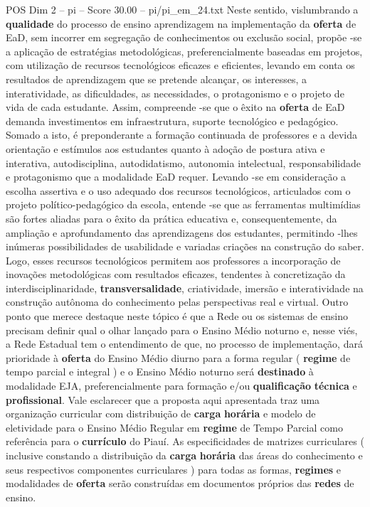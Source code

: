 \begin{textsample}{POS Dim 2 – pi – Score 30.00 – pi/pi\_em\_24.txt}
Neste sentido, vislumbrando a \textbf{qualidade} do processo de ensino aprendizagem na implementação da \textbf{oferta} de EaD, sem incorrer em segregação de conhecimentos ou exclusão social, propõe -se a aplicação de estratégias metodológicas, preferencialmente baseadas em projetos, com utilização de recursos tecnológicos eficazes e eficientes, levando em conta os resultados de aprendizagem que se pretende alcançar, os interesses, a interatividade, as dificuldades, as necessidades, o protagonismo e o projeto de vida de cada estudante.
Assim, compreende -se que o êxito na \textbf{oferta} de EaD demanda investimentos em infraestrutura, suporte tecnológico e pedagógico.
Somado a isto, é preponderante a formação continuada de professores e a devida orientação e estímulos aos estudantes quanto à adoção de postura ativa e interativa, autodisciplina, autodidatismo, autonomia intelectual, responsabilidade e protagonismo que a modalidade EaD requer.
Levando -se em consideração a escolha assertiva e o uso adequado dos recursos tecnológicos, articulados com o projeto político-pedagógico da escola, entende -se que as ferramentas multimídias são fortes aliadas para o êxito da prática educativa e, consequentemente, da ampliação e aprofundamento das aprendizagens dos estudantes, permitindo -lhes inúmeras possibilidades de usabilidade e variadas criações na construção do saber.
Logo, esses recursos tecnológicos permitem aos professores a incorporação de inovações metodológicas com resultados eficazes, tendentes à concretização da interdisciplinaridade, \textbf{transversalidade}, criatividade, imersão e interatividade na construção autônoma do conhecimento pelas perspectivas real e virtual.
Outro ponto que merece destaque neste tópico é que a Rede ou os sistemas de ensino precisam definir qual o olhar lançado para o Ensino Médio noturno e, nesse viés, a Rede Estadual tem o entendimento de que, no processo de implementação, dará prioridade à \textbf{oferta} do Ensino Médio diurno para a forma regular ( \textbf{regime} de tempo parcial e integral ) e o Ensino Médio noturno será \textbf{destinado} à modalidade EJA, preferencialmente para formação e/ou \textbf{qualificação} \textbf{técnica} e \textbf{profissional}.
Vale esclarecer que a proposta aqui apresentada traz uma organização curricular com distribuição de \textbf{carga} \textbf{horária} e modelo de eletividade para o Ensino Médio Regular em \textbf{regime} de Tempo Parcial como referência para o \textbf{currículo} do Piauí.
As especificidades de matrizes curriculares ( inclusive constando a distribuição da \textbf{carga} \textbf{horária} das áreas do conhecimento e seus respectivos componentes curriculares ) para todas as formas, \textbf{regimes} e modalidades de \textbf{oferta} serão construídas em documentos próprios das \textbf{redes} de ensino.

\end{textsample}
